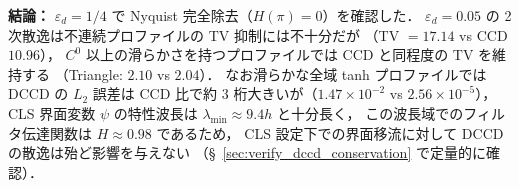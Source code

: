 \noindent\textbf{結論：}
$\varepsilon_d = 1/4$ で Nyquist 完全除去（$H(\pi)=0$）を確認した．
$\varepsilon_d = 0.05$ の 2 次散逸は不連続プロファイルの TV 抑制には不十分だが
（TV $= 17.14$ vs CCD $10.96$），
$C^0$ 以上の滑らかさを持つプロファイルでは CCD と同程度の TV を維持する
（Triangle: $2.10$ vs $2.04$）．
なお滑らかな全域 tanh プロファイルでは DCCD の $L_2$ 誤差は
CCD 比で約 3 桁大きいが（$1.47 \times 10^{-2}$ vs $2.56 \times 10^{-5}$），
CLS 界面変数 $\psi$ の特性波長は $\lambda_{\min} \approx 9.4h$ と十分長く，
この波長域でのフィルタ伝達関数は $H \approx 0.98$ であるため，
CLS 設定下での界面移流に対して DCCD の散逸は殆ど影響を与えない
（§~\ref{sec:verify_dccd_conservation} で定量的に確認）．

